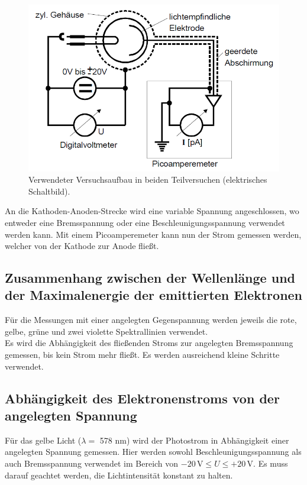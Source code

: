 \begin{figure}
    \centering
    \includegraphics[width=15cm]{Bilder/StromZeug.png}
    \caption{Verwendeter Versuchsaufbau in beiden Teilversuchen (elektrisches Schaltbild).\cite{sample}}
    \label{Abb:StromZeug}
\end{figure}

An die Kathoden-Anoden-Strecke wird eine variable Spannung angeschlossen, wo entweder eine Bremsspannung
oder eine Beschleunigungsspannung verwendet werden kann. Mit einem Picoamperemeter kann nun der Strom 
gemessen werden, welcher von der Kathode zur Anode fließt.

\subsection{Zusammenhang zwischen der Wellenlänge und der Maximalenergie der emittierten Elektronen}

Für die Messungen mit einer angelegten Gegenspannung werden jeweils die rote, gelbe, grüne und zwei
violette Spektrallinien verwendet.\\
Es wird die Abhängigkeit des fließenden Stroms zur angelegten Bremsspannung gemessen, bis kein Strom 
mehr fließt. Es werden ausreichend kleine Schritte verwendet.

\subsection{Abhängigkeit des Elektronenstroms von der angelegten Spannung}

Für das gelbe Licht ($\lambda = $ 578 nm) wird der Photostrom in Abhängigkeit einer angelegten Spannung gemessen. Hier werden sowohl
Beschleunigungsspannung als auch Bremsspannung verwendet im Bereich von $- 20 \, \mathrm{V} \leq U \leq + 20 \, \mathrm{V}$.
Es muss darauf geachtet werden, die Lichtintensität konstant zu halten.